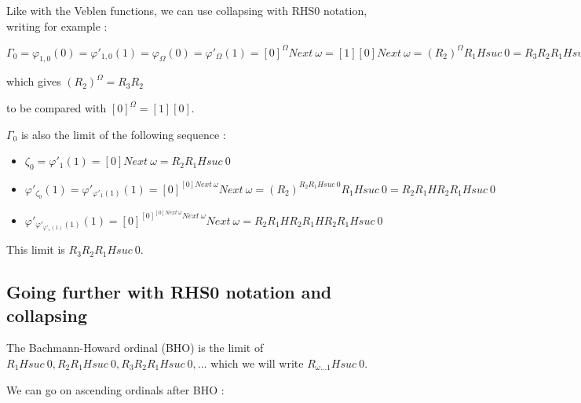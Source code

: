 \documentclass[10pt]{article}
\begin{document}
Like with the Veblen functions, we can use collapsing with RHS0 notation, writing for example : 

\( \Gamma_0 = \varphi_{1,0}(0) = \varphi'_{1,0}(1) = \varphi_\Omega(0) = \varphi'_\Omega(1) = [0]^\Omega Next\ \omega = [1] [0] Next\ \omega = (R_2)^\Omega R_1 H suc\ 0 = R_3 R_2 R_1 H suc\ 0 \) 

which gives \( (R_2)^\Omega = R_3 R_2 \)

to be compared with \( [0]^\Omega = [1] [0] \).

\( \Gamma_0 \) is also the limit of the following sequence : 

\begin{itemize}
     \setlength{\itemsep}{1pt}
     \setlength{\parskip}{0pt}
     \setlength{\parsep}{0pt}

\item \( \zeta_0 = \varphi'_1(1) = [0] Next\ \omega = R_2 R_1 H suc\ 0 \)
\item \( \varphi'_{\zeta_0}(1) = \varphi'_{\varphi'_1(1)}(1) = [0]^{[0] Next\ \omega} Next\ \omega = (R_2)^{R_2 R_1 H suc\ 0} R_1 H suc\ 0 = R_2 R_1 H R_2 R_1 H suc\ 0 \)
\item \( \varphi'_{\varphi'_{\varphi'_1(1)}(1)}(1) = [0]^{[0]^{[0] Next\ \omega} Next\ \omega} Next\ \omega = R_2 R_1 H R_2 R_1 H R_2 R_1 H suc\ 0 \)

\end{itemize}

This limit is \( R_3 R_2 R_1 H suc\ 0 \).



\subsection{Going further with RHS0 notation and collapsing}

The Bachmann-Howard ordinal (BHO) is the limit of \( R_1 H suc\ 0, R_2 R_1 H suc\ 0, R_3 R_2 R_1 H suc\ 0, \ldots \) which we will write \( R_{\omega \ldots 1} H suc\ 0 \).

We can go on ascending ordinals after BHO :
\end{document}
